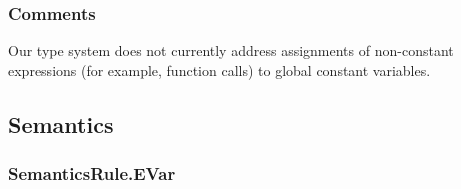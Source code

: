\begin{mathpar}
\end{mathpar}

\begin{mathpar}
\end{mathpar}

\begin{mathpar}
\end{mathpar}

\subsubsection{Comments}
Our type system does not currently address assignments of non-constant expressions (for example,
function calls) to global constant variables.

\subsection{Semantics}
\subsubsection{SemanticsRule.EVar\label{sec:SemanticsRule.EVar}}
